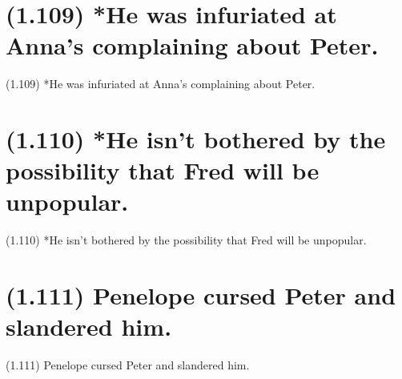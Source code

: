 \documentclass{article}
\begin{document}
\section*{(1.109) *He was infuriated at Anna's complaining about Peter.}

\bigbreak
\begin{enumerate*}
\item[(1.109)] *He was infuriated at Anna's complaining about Peter.
\end{enumerate*}
\bigbreak

\clearpage

%
%

\section*{(1.110) *He isn't bothered by the possibility that Fred will be unpopular.}

\bigbreak
\begin{enumerate*}
\item[(1.110)] *He isn't bothered by the possibility that Fred will be unpopular.
\end{enumerate*}
\bigbreak

\clearpage

%
%

\section*{(1.111) Penelope cursed Peter and slandered him.}

\bigbreak
\begin{enumerate*}
\item[(1.111)] Penelope cursed Peter and slandered him.
\end{enumerate*}
\bigbreak
\end{document}
